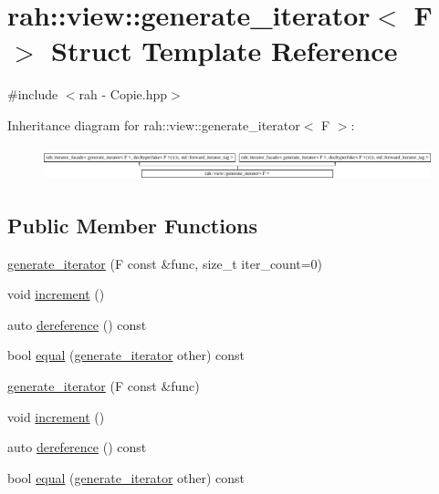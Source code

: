 \hypertarget{structrah_1_1view_1_1generate__iterator}{}\section{rah\+::view\+::generate\+\_\+iterator$<$ F $>$ Struct Template Reference}
\label{structrah_1_1view_1_1generate__iterator}


{\ttfamily \#include $<$rah -\/ Copie.\+hpp$>$}

Inheritance diagram for rah\+::view\+::generate\+\_\+iterator$<$ F $>$\+:\begin{figure}[H]
\begin{center}
\leavevmode
\includegraphics[height=0.987654cm]{structrah_1_1view_1_1generate__iterator}
\end{center}
\end{figure}
\subsection*{Public Member Functions}
\begin{DoxyCompactItemize}
\item 
\mbox{\hyperlink{structrah_1_1view_1_1generate__iterator_af458a280a6089691435a8ad71380fca9}{generate\+\_\+iterator}} (F const \&func, size\+\_\+t iter\+\_\+count=0)
\item 
void \mbox{\hyperlink{structrah_1_1view_1_1generate__iterator_aeb0fc0db74bda811fe5d7cb8c6efe1e0}{increment}} ()
\item 
auto \mbox{\hyperlink{structrah_1_1view_1_1generate__iterator_ab7b0cf4a8f45cfd67278935bd9a39c13}{dereference}} () const
\item 
bool \mbox{\hyperlink{structrah_1_1view_1_1generate__iterator_a8cd374b2e2f6f9e9d3fc841140000f57}{equal}} (\mbox{\hyperlink{structrah_1_1view_1_1generate__iterator}{generate\+\_\+iterator}} other) const
\item 
\mbox{\hyperlink{structrah_1_1view_1_1generate__iterator_a407696209d96fe38234970a91d23e35f}{generate\+\_\+iterator}} (F const \&func)
\item 
void \mbox{\hyperlink{structrah_1_1view_1_1generate__iterator_aeb0fc0db74bda811fe5d7cb8c6efe1e0}{increment}} ()
\item 
auto \mbox{\hyperlink{structrah_1_1view_1_1generate__iterator_ab7b0cf4a8f45cfd67278935bd9a39c13}{dereference}} () const
\item 
bool \mbox{\hyperlink{structrah_1_1view_1_1generate__iterator_a8cd374b2e2f6f9e9d3fc841140000f57}{equal}} (\mbox{\hyperlink{structrah_1_1view_1_1generate__iterator}{generate\+\_\+iterator}} other) const
\end{DoxyCompactItemize}

